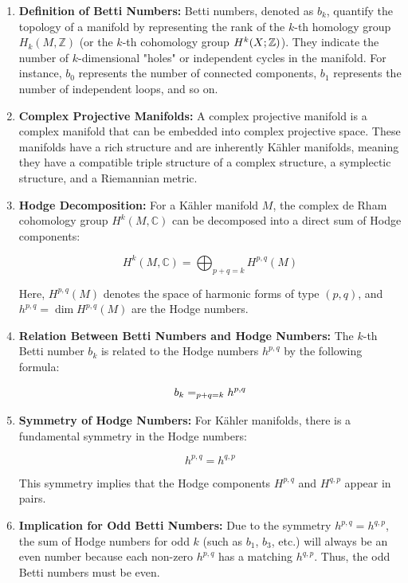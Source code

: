 \documentclass[lang=en,12pt,twoside]{textbook}
\let\sum\relax
\begin{document}
\begin{enumerate}
\item \textbf{Definition of Betti Numbers:}
Betti numbers, denoted as $b_k$, quantify the topology of a manifold by representing the rank of the $k$-th homology group $H_k(M, \mathbb{Z})$ (or the $k$-th cohomology group $H^k(X;{\mathbb Z})$). They indicate the number of $k$-dimensional "holes" or independent cycles in the manifold. For instance, $b_0$ represents the number of connected components, $b_1$ represents the number of independent loops, and so on.

\item \textbf{Complex Projective Manifolds:}
A complex projective manifold is a complex manifold that can be embedded into complex projective space. These manifolds have a rich structure and are inherently Kähler manifolds, meaning they have a compatible triple structure of a complex structure, a symplectic structure, and a Riemannian metric.

\item \textbf{Hodge Decomposition:}
For a Kähler manifold $M$, the complex de Rham cohomology group $H^k(M, \mathbb{C})$ can be decomposed into a direct sum of Hodge components:

$$
H^k(M, \mathbb{C}) = \bigoplus_{p+q=k} H^{p,q}(M)
$$

Here, $H^{p,q}(M)$ denotes the space of harmonic forms of type $(p, q)$, and $h^{p,q} = \dim H^{p,q}(M)$ are the Hodge numbers.

\item \textbf{Relation Between Betti Numbers and Hodge Numbers:}
The $k$-th Betti number $b_k$ is related to the Hodge numbers $h^{p,q}$ by the following formula:

$$
b_k = \sum_{p+q=k} h^{p,q}
$$

\item \textbf{Symmetry of Hodge Numbers:}
For Kähler manifolds, there is a fundamental symmetry in the Hodge numbers:

$$
h^{p,q} = h^{q,p}
$$

This symmetry implies that the Hodge components $H^{p,q}$ and $H^{q,p}$ appear in pairs.

\item \textbf{Implication for Odd Betti Numbers:}
Due to the symmetry $h^{p,q} = h^{q,p}$, the sum of Hodge numbers for odd $k$ (such as $b_1$, $b_3$, etc.) will always be an even number because each non-zero $h^{p,q}$ has a matching $h^{q,p}$. Thus, the odd Betti numbers must be even.


\end{enumerate}
\end{document}

